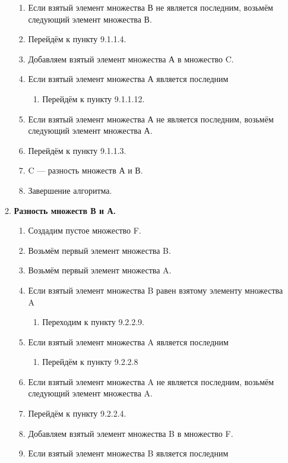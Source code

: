 \documentclass[a4paper,12pt]{extarticle}
\begin{document}
\begin{enumerate}
\begin{enumerate}[label*=\arabic*.]
\begin{enumerate}[label*=\arabic*.]
      \item Если взятый элемент множества В не является последним, возьмём следующий элемент множества В.
      \item Перейдём к пункту 9.1.1.4.
      \item Добавляем взятый элемент множества А в множество C.
      \item Если взятый элемент множества А является последним
      \begin{enumerate}[label*=\arabic*.]
        \item Перейдём к пункту 9.1.1.12.
      \end{enumerate}
      \item Если взятый элемент множества А не является последним, возьмём следующий элемент множества А.
      \item Перейдём к пункту 9.1.1.3.
      \item C — разность множеств А и В.
      \item Завершение алгоритма.
    \end{enumerate}
    \item \textbf{Разность множеств В и А.}
    \begin{enumerate}[label*=\arabic*.]
      \item Создадим пустое множество F.
      \item Возьмём первый элемент множества B.
      \item Возьмём первый элемент множества A.
      \item Если взятый элемент множества B равен взятому элементу множества A
      \begin{enumerate}[label*=\arabic*.]
        \item Переходим к пункту 9.2.2.9.
      \end{enumerate}
      \item Если взятый элемент множества A является последним
      \begin{enumerate}
        \item Перейдём к пункту 9.2.2.8
      \end{enumerate}
      \item Если взятый элемент множества A не является последним, возьмём следующий элемент множества A.
      \item Перейдём к пункту 9.2.2.4.
      \item Добавляем взятый элемент множества B в множество F.
      \item Если взятый элемент множества B является последним

\end{enumerate}
\end{enumerate}
\end{enumerate}
\end{document}
